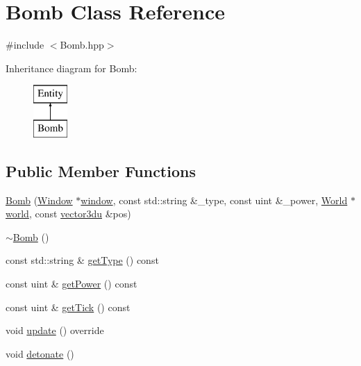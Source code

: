 \hypertarget{class_bomb}{}\section{Bomb Class Reference}
\label{class_bomb}


{\ttfamily \#include $<$Bomb.\+hpp$>$}

Inheritance diagram for Bomb\+:\begin{figure}[H]
\begin{center}
\leavevmode
\includegraphics[height=2.000000cm]{class_bomb}
\end{center}
\end{figure}
\subsection*{Public Member Functions}
\begin{DoxyCompactItemize}
\item 
\mbox{\hyperlink{class_bomb_adf7a216d9286c61dee5e506a98c2d04c}{Bomb}} (\mbox{\hyperlink{class_window}{Window}} $\ast$\mbox{\hyperlink{class_entity_a1f2791b6a53a16e200a687f843cee7fb}{window}}, const std\+::string \&\+\_\+type, const uint \&\+\_\+power, \mbox{\hyperlink{class_world}{World}} $\ast$\mbox{\hyperlink{class_entity_a038b06c38fe6bb385f37c05a5647c0dc}{world}}, const \mbox{\hyperlink{_utility_8hpp_ac675fa2b6c79d0be47ae76e5d0ce38a8}{vector3du}} \&pos)
\item 
\mbox{\hyperlink{class_bomb_acbb47327cfb2fa429887774ef3597965}{$\sim$\+Bomb}} ()
\item 
const std\+::string \& \mbox{\hyperlink{class_bomb_ad41df8612845397927acdb4cc4f13901}{get\+Type}} () const
\item 
const uint \& \mbox{\hyperlink{class_bomb_abd028c863bbfe28d8ef7a5e591ec4fb5}{get\+Power}} () const
\item 
const uint \& \mbox{\hyperlink{class_bomb_a53ec5f4a56715ef504755c7d2acd150e}{get\+Tick}} () const
\item 
void \mbox{\hyperlink{class_bomb_a15851182c209713a5946f977a7fb24b8}{update}} () override
\item 
void \mbox{\hyperlink{class_bomb_addbbd82f5617517df7afb272c654696c}{detonate}} ()
\end{DoxyCompactItemize}

